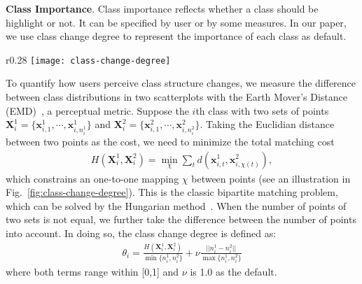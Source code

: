 \vspace{1.5mm}
\noindent\textbf{Class Importance}.
Class importance reflects whether a class should be highlight or not. It can be specified by user or by some measures. In our paper, we use class change degree to represent the importance of each class as default.
\begin{wrapfigure}{r}{0.28\columnwidth}
	\vspace{-5mm}
	\centering
	\texttt{[image: class-change-degree]}
	\vspace*{-8mm}
	\caption{An one-to-one mapping for computing the changes between two classes.}
	\vspace*{-2mm}
	\label{fig:class-change-degree}
\end{wrapfigure}
To quantify how users perceive class structure changes, we measure the difference between class distributions in two scatterplots with the Earth Mover's Distance (EMD)~\cite{rubner2000earth}, a perceptual metric.
Suppose the $i$th  class with two sets of points $\mathbf{X}^1_i = \{\mathbf{x}_{i,1}^1, \cdots , \mathbf{x}_{i,n^1_i}^1\}$ and $\mathbf{X}^2_i = \{\mathbf{x}_{i,1}^2, \cdots , \mathbf{x}_{i,n^2_i}^2\}$.
Taking the Euclidian distance between two points as the cost, we need to  minimize the total matching cost
\begin{align}\label{eq:emd}
 H(\mathbf{X}^1_i, \mathbf{X}^2_i)  = \min_\chi \sum_t d(\mathbf{x}_{i,t}^1, \mathbf{x}_{i,\chi(t)}^2),
\end{align}
which constrains an one-to-one mapping $\chi$ between points (see an illustration in Fig.~\ref{fig:class-change-degree}). This is the classic bipartite matching problem, which can be solved by the Hungarian method~\cite{kuhn1955hungarian}.
When the number of points of two sets is not equal, we further take the difference between the number of points into account. In doing so, the class change degree is defined as:
\begin{align}\label{eq:cm}
 \theta_i= \frac{H(\mathbf{X}^1_i, \mathbf{X}^2_i) }{\min\{n^1_i, n^2_i\}} + \nu \frac{||n^1_i- n^2_i||}{\max\{n^1_i, n^2_i\}}
\end{align}
where both terms range within [0,1] and $\nu$ is 1.0 as the default.


